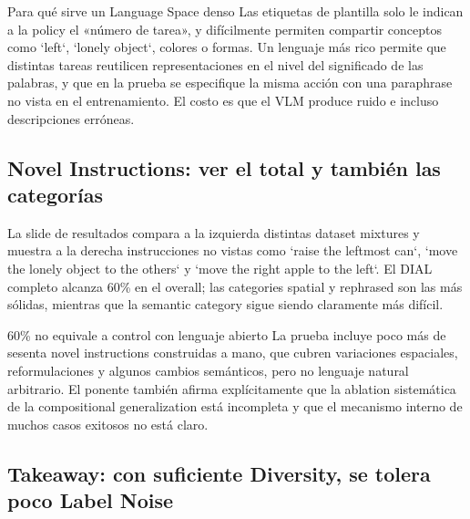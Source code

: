 
\begin{knowledgebox}{Para qué sirve un Language Space denso}
Las etiquetas de plantilla solo le indican a la policy el «número de tarea», y difícilmente permiten compartir conceptos como `left`, `lonely object`, colores o formas. Un lenguaje más rico permite que distintas tareas reutilicen representaciones en el nivel del significado de las palabras, y que en la prueba se especifique la misma acción con una paraphrase no vista en el entrenamiento. El costo es que el VLM produce ruido e incluso descripciones erróneas.
\end{knowledgebox}

\subsection{Novel Instructions: ver el total y también las categorías}

La slide de resultados compara a la izquierda distintas dataset mixtures y muestra a la derecha instrucciones no vistas como `raise the leftmost can`, `move the lonely object to the others` y `move the right apple to the left`. El DIAL completo alcanza 60\% en el overall; las categories spatial y rephrased son las más sólidas, mientras que la semantic category sigue siendo claramente más difícil.


\begin{warningbox}{60\% no equivale a control con lenguaje abierto}
La prueba incluye poco más de sesenta novel instructions construidas a mano, que cubren variaciones espaciales, reformulaciones y algunos cambios semánticos, pero no lenguaje natural arbitrario. El ponente también afirma explícitamente que la ablation sistemática de la compositional generalization está incompleta y que el mecanismo interno de muchos casos exitosos no está claro.
\end{warningbox}

\subsection{Takeaway: con suficiente Diversity, se tolera poco Label Noise}

